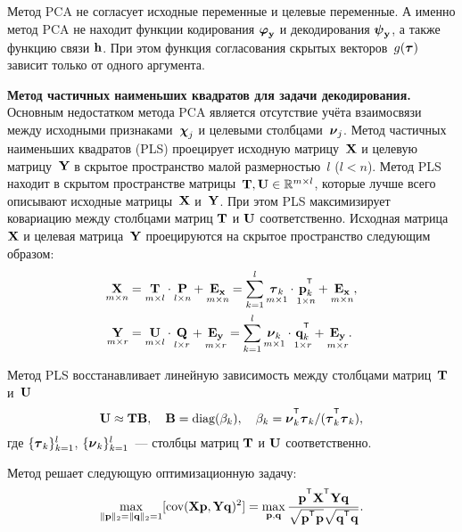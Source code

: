 \documentclass[11pt, a5paper]{dissert}
\begin{document}
Метод PCA не согласует исходные переменные и целевые переменные. 
А именно метод PCA не находит функции кодирования $\boldsymbol{\varphi}_{\mathbf{y}}$ и декодирования $\boldsymbol{\psi}_{\mathbf{y}}$, а также функцию связи $\mathbf{h}$. 
При этом функция согласования скрытых векторов~$g(\boldsymbol{\tau})$ зависит только от одного аргумента.


\vspace{0.5cm}
\textbf{Метод частичных наименьших квадратов для задачи декодирования.}
Основным недостатком метода PCA является отсутствие учёта взаимосвязи между исходными признаками~$\boldsymbol{\chi}_j$ и целевыми столбцами~$\boldsymbol{\nu}_j$.
Метод частичных наименьших квадратов (PLS) проецирует исходную матрицу~$\mathbf{X}$ и целевую матрицу~$\mathbf{Y}$ в скрытое пространство малой размерностью~$l$ ($l < n$).
Метод PLS находит в скрытом пространстве матрицы~$\mathbf{T}, \mathbf{U} \in \mathbb{R}^{m \times l}$, которые лучше всего описывают исходные матрицы~$\mathbf{X}$ и~$\mathbf{Y}$. 
При этом PLS максимизирует ковариацию между столбцами матриц $\mathbf{T}$ и $\mathbf{U}$ соответственно.
Исходная матрица~$\mathbf{X}$ и целевая матрица~$\mathbf{Y}$ проецируются на скрытое пространство следующим образом:
\begin{align}
	\label{ch1:eq:PLS_X}
	\underset{m \times n}{\bX} 
	&= \underset{m \times l}{\bT} \cdot \underset{l \times n}{\bP} + \underset{m \times n}{\bE_{\bx}} 
	= \sum_{k=1}^l \underset{m \times 1}{\btau_k} \cdot \underset{1 \times n}{\bp_k^{\T}} + \underset{m \times n}{\bE_{\bx}},\\
	\label{ch1:eq:PLS_Y}
	\underset{m \times r}{\bY} 
	&= \underset{m \times l}{\bU} \cdot \underset{l \times r}{\bQ} + \underset{m \times r}{\bE_{\by}}
	=  \sum_{k=1}^l  \underset{m \times 1}{\bnu_k} \cdot \underset{1 \times r}{\bq_k^{\T}} +  \underset{m \times r}{\bE_{\by}}.
\end{align}

Метод PLS восстанавливает линейную зависимость между столбцами матриц~$\mathbf{T}$ и~$\mathbf{U}$
\begin{equation*}
	\bU \approx \bT \bB, \quad \bB = \text{diag}(\beta_k), \quad \beta_k = \bnu_k^{\T}\btau_k / (\btau_k^{\T}\btau_k),
\end{equation*}
где $\{\boldsymbol{\tau}_k\}_{k=1}^l$, $\{\boldsymbol{\nu}_k\}_{k=1}^l$~--- столбцы матриц $\mathbf{T}$ и $\mathbf{U}$ соответственно.

Метод решает следующую оптимизационную задачу:
\begin{equation}
	\max_{\|\bp\|_{2}=\|\bq\|_{2}=1}[ \text{cov}(\bX \bp, \bY \bq)^{2}] = \max_{\bp, \bq} \frac{\bp^{\T} \bX^{\T} \bY \bq}{\sqrt{\bp^{\T} \bp} \sqrt{\bq^{\T} \bq}}.
	\label{ch1:eq:pls_max_cov}
\end{equation}
\end{document}
